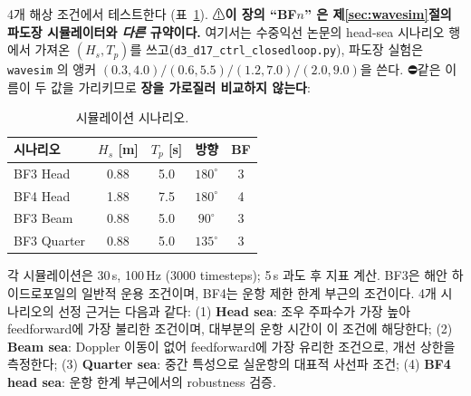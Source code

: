 \documentclass[11pt]{report}
\numberwithin{equation}{chapter}
\numberwithin{figure}{chapter}
\numberwithin{table}{chapter}
\begin{document}
4개 해상 조건에서 테스트한다 (표~\ref{tab:scenarios}).
⚠\textbf{이 장의 ``BF$n$'' 은 제\ref{sec:wavesim}절의 파도장 시뮬레이터와 \emph{다른}
규약이다.} 여기서는 수중익선 논문의 head-sea 시나리오 행에서 가져온
$(H_s, T_p)$를 쓰고(\texttt{d3\_d17\_ctrl\_closedloop.py}), 파도장 실험은
\texttt{wavesim} 의 앵커 $(0.3,4.0)/(0.6,5.5)/(1.2,7.0)/(2.0,9.0)$을 쓴다.
⛔같은 이름이 두 값을 가리키므로 \textbf{장을 가로질러 비교하지 않는다}:

\begin{table}[htbp]
\centering
\caption{시뮬레이션 시나리오.}
\label{tab:scenarios}
\begin{tabular}{lcccc}
\toprule
시나리오 & $H_s$ [m] & $T_p$ [s] & 방향 & BF \\
\midrule
BF3 Head    & 0.88 & 5.0 & $180^\circ$ & 3 \\
BF4 Head    & 1.88 & 7.5 & $180^\circ$ & 4 \\
BF3 Beam    & 0.88 & 5.0 & $90^\circ$  & 3 \\
BF3 Quarter & 0.88 & 5.0 & $135^\circ$ & 3 \\
\bottomrule
\end{tabular}
\end{table}

각 시뮬레이션은 30\,s, 100\,Hz (3000 timesteps); 5\,s 과도 후 지표 계산.
BF3은 해안 하이드로포일의 일반적 운용 조건이며,
BF4는 운항 제한 한계 부근의 조건이다.
4개 시나리오의 선정 근거는 다음과 같다:
(1) \textbf{Head sea}: 조우 주파수가 가장 높아 feedforward에 가장 불리한 조건이며,
대부분의 운항 시간이 이 조건에 해당한다;
(2) \textbf{Beam sea}: Doppler 이동이 없어 feedforward에 가장 유리한 조건으로,
개선 상한을 측정한다;
(3) \textbf{Quarter sea}: 중간 특성으로 실운항의 대표적 사선파 조건;
(4) \textbf{BF4 head sea}: 운항 한계 부근에서의 robustness 검증.
\end{document}
